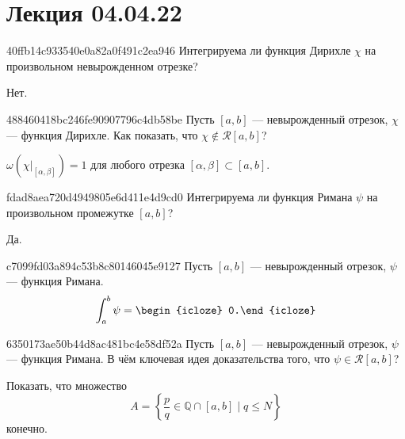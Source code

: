 \section{Лекция 04.04.22}
\begin{note}{40ffb14c933540e0a82a0f491c2ea946}
    Интегрируема ли функция Дирихле \({ \chi }\) на произвольном невырожденном отрезке?

    \begin{cloze}{1}
        Нет.
    \end{cloze}
\end{note}

\begin{note}{488460418bc246fe90907796c4db58be}
    Пусть \({ [a, b]  }\) --- невырожденный отрезок, \({ \chi }\) --- функция Дирихле.
    Как показать, что \({ \chi \not\in \mathcal R[a, b] }\)?

    \begin{cloze}{1}
        \({ \omega(\chi|_{[\alpha, \beta]}) = 1 }\) для любого отрезка \({ [\alpha, \beta] \subset [a, b] }\).
    \end{cloze}
\end{note}

\begin{note}{fdad8aea720d4949805e6d411e4d9cd0}
    Интегрируема ли функция Римана \({ \psi }\) на произвольном промежутке \({ [a, b] }\)?

    \begin{cloze}{1}
        Да.
    \end{cloze}
\end{note}

\begin{note}{c7099fd03a894c53b8c80146045e9127}
    Пусть \({ [a, b]  }\) --- невырожденный отрезок, \({ \psi }\) --- функция Римана.
    \[
        \int_{a}^{b} \psi = \begin{icloze}{1}0.\end{icloze}
    \]
\end{note}

\begin{note}{6350173ae50b44d8ac481bc4e58df52a}
    Пусть \({ [a, b]  }\) --- невырожденный отрезок, \({ \psi }\) --- функция Римана.
    В чём ключевая идея доказательства того, что \({ \psi \in \mathcal R[a, b] }\)?

    \begin{cloze}{1}
        Показать, что множество
        \[
            A = \left\{ \frac{p}{q} \in \mathbb Q \cap [a, b] \mid q \leqslant N \right\}
        \]
        конечно.
    \end{cloze}
\end{note}

